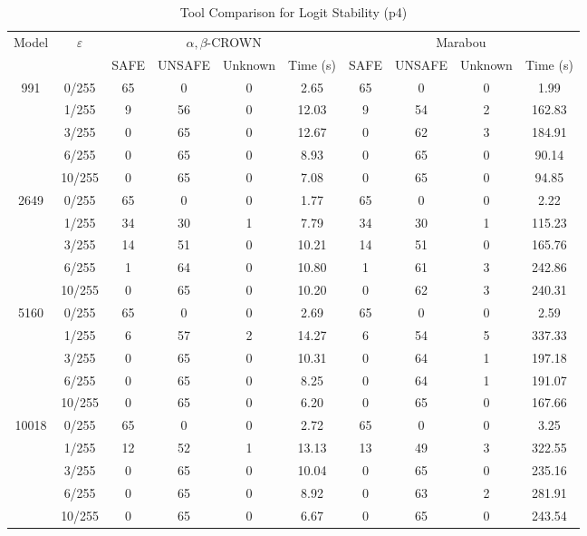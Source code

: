 \begin{table}[htbp]
\centering
\caption{Tool Comparison for Logit Stability (p4)}
\label{tab:p4_tool_comparison}
\begin{tabular}{|c|c|c|c|c|c|c|c|c|c|}
\hline
\multirow{2}{*}{Model} & \multirow{2}{*}{$\varepsilon$} & \multicolumn{4}{c|}{$\alpha,\beta$-CROWN} & \multicolumn{4}{c|}{Marabou} \\ \cline{3-10}
 & & SAFE & UNSAFE & Unknown & Time (s) & SAFE & UNSAFE & Unknown & Time (s) \\ \hline
\multirow{5}{*}{991} & 0/255 & 65 & 0 & 0 & 2.65 & 65 & 0 & 0 & 1.99 \\ 
  & 1/255 & 9 & 56 & 0 & 12.03 & 9 & 54 & 2 & 162.83 \\ 
  & 3/255 & 0 & 65 & 0 & 12.67 & 0 & 62 & 3 & 184.91 \\ 
  & 6/255 & 0 & 65 & 0 & 8.93 & 0 & 65 & 0 & 90.14 \\ 
  & 10/255 & 0 & 65 & 0 & 7.08 & 0 & 65 & 0 & 94.85 \\ \hline
\hline
\multirow{5}{*}{2649} & 0/255 & 65 & 0 & 0 & 1.77 & 65 & 0 & 0 & 2.22 \\ 
  & 1/255 & 34 & 30 & 1 & 7.79 & 34 & 30 & 1 & 115.23 \\ 
  & 3/255 & 14 & 51 & 0 & 10.21 & 14 & 51 & 0 & 165.76 \\ 
  & 6/255 & 1 & 64 & 0 & 10.80 & 1 & 61 & 3 & 242.86 \\ 
  & 10/255 & 0 & 65 & 0 & 10.20 & 0 & 62 & 3 & 240.31 \\ \hline
\hline
\multirow{5}{*}{5160} & 0/255 & 65 & 0 & 0 & 2.69 & 65 & 0 & 0 & 2.59 \\ 
  & 1/255 & 6 & 57 & 2 & 14.27 & 6 & 54 & 5 & 337.33 \\ 
  & 3/255 & 0 & 65 & 0 & 10.31 & 0 & 64 & 1 & 197.18 \\ 
  & 6/255 & 0 & 65 & 0 & 8.25 & 0 & 64 & 1 & 191.07 \\ 
  & 10/255 & 0 & 65 & 0 & 6.20 & 0 & 65 & 0 & 167.66 \\ \hline
\hline
\multirow{5}{*}{10018} & 0/255 & 65 & 0 & 0 & 2.72 & 65 & 0 & 0 & 3.25 \\ 
  & 1/255 & 12 & 52 & 1 & 13.13 & 13 & 49 & 3 & 322.55 \\ 
  & 3/255 & 0 & 65 & 0 & 10.04 & 0 & 65 & 0 & 235.16 \\ 
  & 6/255 & 0 & 65 & 0 & 8.92 & 0 & 63 & 2 & 281.91 \\ 
  & 10/255 & 0 & 65 & 0 & 6.67 & 0 & 65 & 0 & 243.54 \\ 
\hline
\end{tabular}
\end{table}
